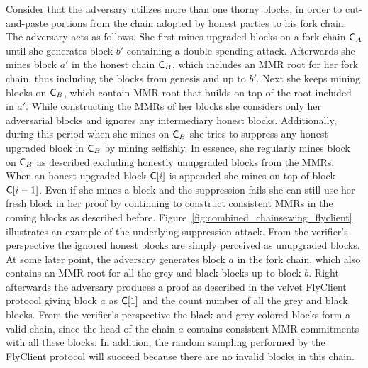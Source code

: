 	Consider that the adversary utilizes more than one thorny blocks, in order to cut-and-paste portions from the chain adopted by honest parties to his fork chain. 
    The adversary acts as follows. 
    She first mines upgraded blocks on a fork chain $\mathsf{C}_A$ until she generates block $b'$ containing a double spending attack. 
    Afterwards she mines block $a'$ in the honest chain $\mathsf{C}_B$, which includes an MMR root for her fork chain, thus including the blocks from genesis and up to $b'$. 
    Next she keeps mining blocks on $\mathsf{C}_B$, which contain MMR root that builds on top of the root included in $a'$. While constructing the MMRs of her blocks she considers only her 
    adversarial blocks and ignores any intermediary honest blocks. 
    Additionally, during this period when she mines on $\mathsf{C}_B$ she tries to suppress any honest upgraded block in $\mathsf{C}_B$ by mining selfishly. 
    In essence, she regularly mines block on $\mathsf{C}_B$ as described excluding honestly unupgraded blocks from the MMRs. 
    When an honest upgraded block $\mathsf{C}[i]$ is appended she mines on top of block $\mathsf{C}[i-1]$. 
    Even if she mines a block and the suppression fails she can still use her fresh block in her proof by continuing to construct consistent MMRs 
    in the coming blocks as described before. Figure~\ref{fig:combined_chainsewing_flyclient} illustrates an example of the underlying suppression attack.
	From the verifier's perspective the ignored honest blocks are simply perceived as unupgraded blocks. At some later point, the adversary generates block $a$ 
    in the fork chain, which also contains an MMR root for all the grey and black blocks up to block $b$. 
    Right afterwards the adversary produces a proof as described in the velvet FlyClient protocol giving block $a$ as $\mathsf{C}[1]$ 
    and the count number of all the grey and black blocks. From the verifier's perspective the black and grey colored blocks form a valid chain, 
    since the head of the chain $a$ contains consistent MMR commitments with all these blocks. 
    In addition, the random sampling performed by the FlyClient protocol will succeed because there are no invalid blocks in this chain.



